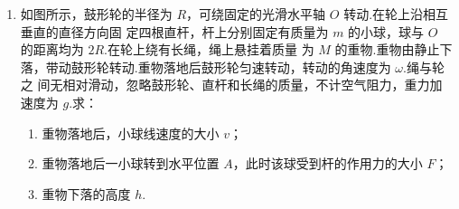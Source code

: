 \begin{enumerate}




\item
如图所示，鼓形轮的半径为 $ R $，可绕固定的光滑水平轴 $ O $ 转动.在轮上沿相互垂直的直径方向固
定四根直杆，杆上分别固定有质量为 $ m $ 的小球，球与 $ O $ 的距离均为 $ 2R $.在轮上绕有长绳，绳上悬挂着质量
为 $ M $ 的重物.重物由静止下落，带动鼓形轮转动.重物落地后鼓形轮匀速转动，转动的角速度为 $ \omega $.绳与轮之
间无相对滑动，忽略鼓形轮、直杆和长绳的质量，不计空气阻力，重力加速度为 $ g $.求：
\begin{enumerate}
\item
重物落地后，小球线速度的大小 $ v $；
\item 
重物落地后一小球转到水平位置 $ A $，此时该球受到杆的作用力的大小 $ F $；
\item 
重物下落的高度 $ h $.
\end{enumerate}
\begin{figure}[h!]
\flushright

\end{figure}









\newpage


\end{enumerate}
